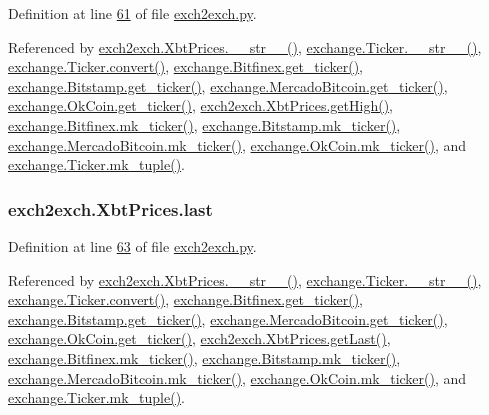 Definition at line \hyperlink{exch2exch_8py_source_l00061}{61} of file \hyperlink{exch2exch_8py_source}{exch2exch.\+py}.



Referenced by \hyperlink{exch2exch_8py_source_l00091}{exch2exch.\+Xbt\+Prices.\+\_\+\+\_\+str\+\_\+\+\_\+()}, \hyperlink{exchange_8py_source_l00111}{exchange.\+Ticker.\+\_\+\+\_\+str\+\_\+\+\_\+()}, \hyperlink{exchange_8py_source_l00065}{exchange.\+Ticker.\+convert()}, \hyperlink{exchange_8py_source_l00340}{exchange.\+Bitfinex.\+get\+\_\+ticker()}, \hyperlink{exchange_8py_source_l00409}{exchange.\+Bitstamp.\+get\+\_\+ticker()}, \hyperlink{exchange_8py_source_l00543}{exchange.\+Mercado\+Bitcoin.\+get\+\_\+ticker()}, \hyperlink{exchange_8py_source_l00608}{exchange.\+Ok\+Coin.\+get\+\_\+ticker()}, \hyperlink{exch2exch_8py_source_l00076}{exch2exch.\+Xbt\+Prices.\+get\+High()}, \hyperlink{exchange_8py_source_l00354}{exchange.\+Bitfinex.\+mk\+\_\+ticker()}, \hyperlink{exchange_8py_source_l00423}{exchange.\+Bitstamp.\+mk\+\_\+ticker()}, \hyperlink{exchange_8py_source_l00557}{exchange.\+Mercado\+Bitcoin.\+mk\+\_\+ticker()}, \hyperlink{exchange_8py_source_l00622}{exchange.\+Ok\+Coin.\+mk\+\_\+ticker()}, and \hyperlink{exchange_8py_source_l00096}{exchange.\+Ticker.\+mk\+\_\+tuple()}.

\subsubsection[{\texorpdfstring{last}{last}}]{\setlength{\rightskip}{0pt plus 5cm}exch2exch.\+Xbt\+Prices.\+last}\hypertarget{classexch2exch_1_1_xbt_prices_a1da8993986574b27edcaf7259e78c899}{}\label{classexch2exch_1_1_xbt_prices_a1da8993986574b27edcaf7259e78c899}


Definition at line \hyperlink{exch2exch_8py_source_l00063}{63} of file \hyperlink{exch2exch_8py_source}{exch2exch.\+py}.



Referenced by \hyperlink{exch2exch_8py_source_l00091}{exch2exch.\+Xbt\+Prices.\+\_\+\+\_\+str\+\_\+\+\_\+()}, \hyperlink{exchange_8py_source_l00111}{exchange.\+Ticker.\+\_\+\+\_\+str\+\_\+\+\_\+()}, \hyperlink{exchange_8py_source_l00065}{exchange.\+Ticker.\+convert()}, \hyperlink{exchange_8py_source_l00340}{exchange.\+Bitfinex.\+get\+\_\+ticker()}, \hyperlink{exchange_8py_source_l00409}{exchange.\+Bitstamp.\+get\+\_\+ticker()}, \hyperlink{exchange_8py_source_l00543}{exchange.\+Mercado\+Bitcoin.\+get\+\_\+ticker()}, \hyperlink{exchange_8py_source_l00608}{exchange.\+Ok\+Coin.\+get\+\_\+ticker()}, \hyperlink{exch2exch_8py_source_l00082}{exch2exch.\+Xbt\+Prices.\+get\+Last()}, \hyperlink{exchange_8py_source_l00354}{exchange.\+Bitfinex.\+mk\+\_\+ticker()}, \hyperlink{exchange_8py_source_l00423}{exchange.\+Bitstamp.\+mk\+\_\+ticker()}, \hyperlink{exchange_8py_source_l00557}{exchange.\+Mercado\+Bitcoin.\+mk\+\_\+ticker()}, \hyperlink{exchange_8py_source_l00622}{exchange.\+Ok\+Coin.\+mk\+\_\+ticker()}, and \hyperlink{exchange_8py_source_l00096}{exchange.\+Ticker.\+mk\+\_\+tuple()}.

